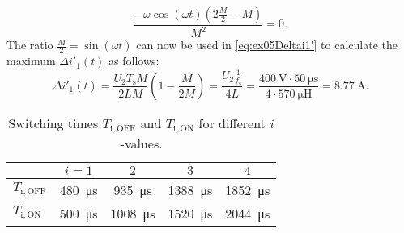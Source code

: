 \begin{solutionblock}
    \begin{equation}
        \frac{-\omega \cos(\omega t)(2 \frac{M}{2}-M)}{M^2}=0.
    \end{equation}
    The ratio $\frac{M}{2}=\sin(\omega t)$ can now be used in \eqref{eq:ex05Deltai1'} to calculate the maximum $\Delta i'_{\mathrm{1}}(t)$ as follows:
    \begin{equation}
        \Delta i'_{\mathrm{1}}(t) = \frac{U_{\mathrm{2}}T_{\mathrm{s}}M}{2LM}\left(1-\frac{M}{2M}\right) = \frac{U_{\mathrm{2}}\frac{1}{f_\mathrm{s}}}{4L}=\frac{\SI{400}{\volt}\cdot \SI{50}{\micro\s}}{4\cdot\SI{570}{\micro\henry}} = \SI{8.77}{\ampere}.
    \end{equation}
\end{solutionblock}


\begin{table}[ht]
    \centering
    
    \begin{tabular}{lcccc}
        \toprule
        & $i = 1$ & $2$ & $3$ & $4$ \\
        \midrule
       $T_\mathrm{i,OFF}$& \SI{480}{\micro\second} & \SI{935}{\micro\second} & \SI{1388}{\micro\second} & \SI{1852}{\micro\second} \\
        $T_\mathrm{i,ON}$  & \SI{500}{\micro\second} & \SI{1008}{\micro\second} & \SI{1520}{\micro\second} & \SI{2044}{\micro\second} \\
        \bottomrule
    \end{tabular}
    \caption{Switching times $T_\mathrm{i,OFF}$ and $T_\mathrm{i,ON}$ for different $i$-values.}
    \label{tab:switching_times}
\end{table}

